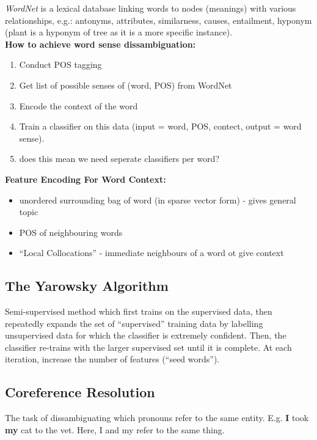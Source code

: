 \documentclass[]{article}
\begin{document}
	\textit{WordNet} is a lexical database linking words to nodes (meanings) with various relationships, e.g.: antonyms, attributes, similarness, causes, entailment, hyponym (plant is a hyponym of tree as it is a more specific instance). \\
	
	\textbf{How to achieve word sense dissambiguation:} 
	
	\begin{enumerate}
	 \item Conduct POS tagging
	 \item Get list of possible senses of (word, POS) from WordNet
	 \item Encode the context of the word
	 \item Train a classifier on this data (input = word, POS, contect, output = word sense).
	 \item does this mean we need seperate classifiers per word?
	\end{enumerate}
    
    \textbf{Feature Encoding For Word Context:} \\
	
	\begin{itemize}
	 \item unordered surrounding bag of word (in sparse vector form) - gives general topic
	 \item POS of neighbouring words
	 \item ``Local Collocations'' - immediate neighbours of a word ot give context
	\end{itemize}

	\subsection{The Yarowsky Algorithm}
	Semi-supervised method which first trains on the supervised data, then repeatedly expands the set of ``supervised'' training data by labelling unsupervised data for which the classifier is extremely confident. Then, the classifier re-trains with the larger supervised set until it is complete. At each iteration, increase the number of features (``seed words'').
	
	\subsection{Coreference Resolution}
	The task of dissambiguating which pronouns refer to the same entity. E.g. \textbf{I} took \textbf{my} cat to the vet. Here, I and my refer to the same thing.
	
\end{document}
